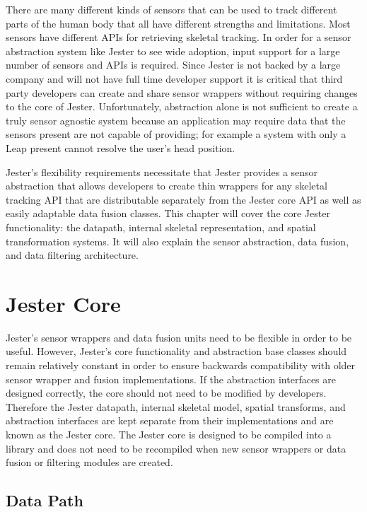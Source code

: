 There are many different kinds of sensors that can be used to track different parts of the human body that all have different strengths and limitations. Most sensors have different APIs for retrieving skeletal tracking. In order for a sensor abstraction system like Jester to see wide adoption, input support for a large number of sensors and APIs is required. Since Jester is not backed by a large company and will not have full time developer support it is critical that third party developers can create and share sensor wrappers without requiring changes to the core of Jester. Unfortunately, abstraction alone is not sufficient to create a truly sensor agnostic system because an application may require data that the sensors present are not capable of providing; for example a system with only a Leap present cannot resolve the user’s head position. 

Jester’s flexibility requirements necessitate that Jester provides a sensor abstraction that allows developers to create thin wrappers for any skeletal tracking API that are distributable separately from the Jester core API as well as easily adaptable data fusion classes. This chapter will cover the core Jester functionality: the datapath, internal skeletal representation, and spatial transformation systems. It will also explain the sensor abstraction, data fusion, and data filtering architecture.

\section{Jester Core}\label{sec:jester_core}

Jester’s sensor wrappers and data fusion units need to be flexible in order to be useful. However, Jester’s core functionality and abstraction base classes should remain relatively constant in order to ensure backwards compatibility with older sensor wrapper and fusion implementations. If the abstraction interfaces are  designed correctly, the core should not need to be modified by developers. Therefore the Jester datapath, internal skeletal model, spatial transforms, and abstraction interfaces are kept separate from their implementations and are known as the Jester core. The Jester core is designed to be compiled into a library and does not need to be recompiled when new sensor wrappers or data fusion or filtering modules are created.

\subsection{Data Path}

